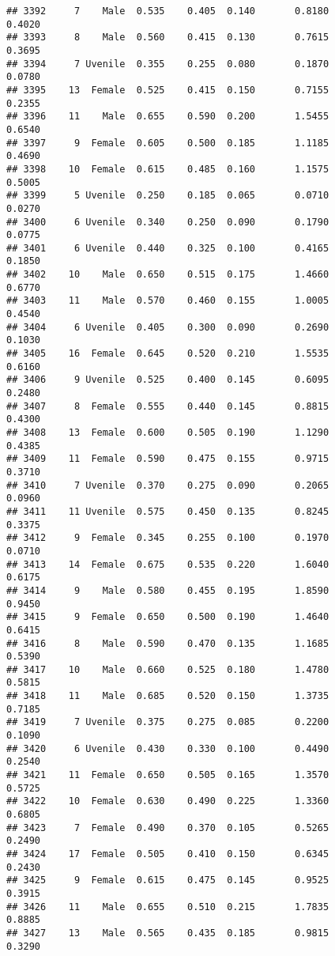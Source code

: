 \documentclass[
]{article}
\begin{document}
\begin{verbatim}
## 3392     7    Male  0.535    0.405  0.140       0.8180         0.4020
## 3393     8    Male  0.560    0.415  0.130       0.7615         0.3695
## 3394     7 Uvenile  0.355    0.255  0.080       0.1870         0.0780
## 3395    13  Female  0.525    0.415  0.150       0.7155         0.2355
## 3396    11    Male  0.655    0.590  0.200       1.5455         0.6540
## 3397     9  Female  0.605    0.500  0.185       1.1185         0.4690
## 3398    10  Female  0.615    0.485  0.160       1.1575         0.5005
## 3399     5 Uvenile  0.250    0.185  0.065       0.0710         0.0270
## 3400     6 Uvenile  0.340    0.250  0.090       0.1790         0.0775
## 3401     6 Uvenile  0.440    0.325  0.100       0.4165         0.1850
## 3402    10    Male  0.650    0.515  0.175       1.4660         0.6770
## 3403    11    Male  0.570    0.460  0.155       1.0005         0.4540
## 3404     6 Uvenile  0.405    0.300  0.090       0.2690         0.1030
## 3405    16  Female  0.645    0.520  0.210       1.5535         0.6160
## 3406     9 Uvenile  0.525    0.400  0.145       0.6095         0.2480
## 3407     8  Female  0.555    0.440  0.145       0.8815         0.4300
## 3408    13  Female  0.600    0.505  0.190       1.1290         0.4385
## 3409    11  Female  0.590    0.475  0.155       0.9715         0.3710
## 3410     7 Uvenile  0.370    0.275  0.090       0.2065         0.0960
## 3411    11 Uvenile  0.575    0.450  0.135       0.8245         0.3375
## 3412     9  Female  0.345    0.255  0.100       0.1970         0.0710
## 3413    14  Female  0.675    0.535  0.220       1.6040         0.6175
## 3414     9    Male  0.580    0.455  0.195       1.8590         0.9450
## 3415     9  Female  0.650    0.500  0.190       1.4640         0.6415
## 3416     8    Male  0.590    0.470  0.135       1.1685         0.5390
## 3417    10    Male  0.660    0.525  0.180       1.4780         0.5815
## 3418    11    Male  0.685    0.520  0.150       1.3735         0.7185
## 3419     7 Uvenile  0.375    0.275  0.085       0.2200         0.1090
## 3420     6 Uvenile  0.430    0.330  0.100       0.4490         0.2540
## 3421    11  Female  0.650    0.505  0.165       1.3570         0.5725
## 3422    10  Female  0.630    0.490  0.225       1.3360         0.6805
## 3423     7  Female  0.490    0.370  0.105       0.5265         0.2490
## 3424    17  Female  0.505    0.410  0.150       0.6345         0.2430
## 3425     9  Female  0.615    0.475  0.145       0.9525         0.3915
## 3426    11    Male  0.655    0.510  0.215       1.7835         0.8885
## 3427    13    Male  0.565    0.435  0.185       0.9815         0.3290

\end{verbatim}
\end{document}
